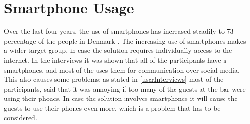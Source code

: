 \section{Smartphone Usage}
\label{sub:smartphone_usage}

Over the last four years, the use of smartphones has increased steadily to 73 percentage of the people in Denmark \cite{smartphone2014}. The increasing use of smartphones makes a wider target group, in case the solution requires individually access to the internet. In the interviews it was shown that all of the participants have a smartphones, and most of the uses them for communication over social media. This also causes some problems; as stated in \cref{userInterviews} most of the participants, said that it was annoying if too many of the guests at the bar were using their phones. In case the solution involves smartphones it will cause the guests to use their phones even more, which is a problem that has to be considered.

